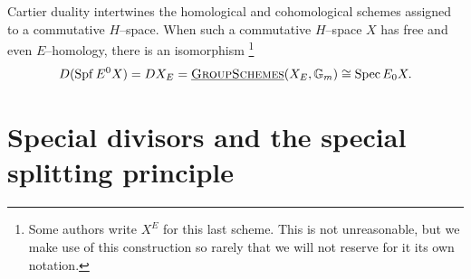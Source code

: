 \begin{remark}\label{TopologicalCartierDuality}
Cartier duality intertwines the homological and cohomological schemes assigned to a commutative \(H\)--space.
When such a commutative \(H\)--space \(X\) has free and even \(E\)--homology, there is an isomorphism%
\footnote{%
Some authors write \(X^E\) for this last scheme.
This is not unreasonable, but we make use of this construction so rarely that we will not reserve for it its own notation.
}
\[D(\operatorname{Spf} E^0 X) = DX_E = \operatorname{\underline{\smash{\normalfont\textsc{GroupSchemes}}}}(X_E, \mathbb G_m) \cong \operatorname{Spec} E_0 X.\]
\end{remark}












\section{Special divisors and the special splitting principle}\label{MSUDay}

